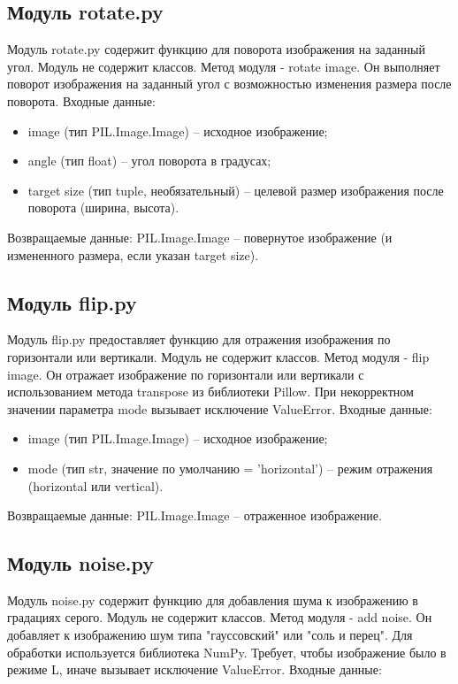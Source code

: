 \subsection{Модуль rotate.py}

Модуль rotate.py содержит функцию для поворота изображения на заданный угол. Модуль не содержит классов. Метод модуля - rotate image. Он выполняет поворот изображения на заданный угол с возможностью изменения размера после поворота. Входные данные:

\begin{itemize}
	\item image (тип PIL.Image.Image) – исходное изображение;
	\item angle (тип float) – угол поворота в градусах;
	\item target size (тип tuple, необязательный) – целевой размер изображения после поворота (ширина, высота).
\end{itemize}

Возвращаемые данные: PIL.Image.Image – повернутое изображение (и измененного размера, если указан target size).

\subsection{Модуль flip.py}

Модуль flip.py предоставляет функцию для отражения изображения по горизонтали или вертикали. Модуль не содержит классов. Метод модуля - flip image. Он отражает изображение по горизонтали или вертикали с использованием метода transpose из библиотеки Pillow. При некорректном значении параметра mode вызывает исключение ValueError. Входные данные:

\begin{itemize}
	\item image (тип PIL.Image.Image) – исходное изображение;
	\item mode (тип str, значение по умолчанию = 'horizontal') – режим отражения (horizontal или vertical).
\end{itemize}

Возвращаемые данные: PIL.Image.Image – отраженное изображение.

\subsection{Модуль noise.py}

Модуль noise.py содержит функцию для добавления шума к изображению в градациях серого. Модуль не содержит классов. Метод модуля - add noise. Он добавляет к изображению шум типа "гауссовский" или "соль и перец". Для обработки используется библиотека NumPy. Требует, чтобы изображение было в режиме L, иначе вызывает исключение ValueError. Входные данные:

